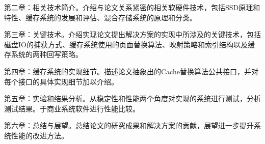 第二章：相关技术简介。介绍与论文关系紧密的相关软硬件技术，包括SSD原理和特性、缓存系统的发展和评估、混合存储系统的原理和分类。

第三章：关键技术。介绍实现论文提出解决方案的实现中所涉及的关键技术，包括磁盘IO的捕获方式、缓存系统使用的页面替换算法、映射策略和索引结构以及缓存系统的两种回写策略。

第四章：缓存系统的实现细节。描述论文抽象出的Cache替换算法公共接口，并对每个接口的具体实现细节加以介绍。

第五章：实验和结果分析。从稳定性和性能两个角度对实现的系统进行测试，分析测试结果。于商业系统软件进行性能比较。

第六章：总结与展望。总结论文的研究成果和解决方案的贡献，展望进一步提升系统性能的改进方法。

